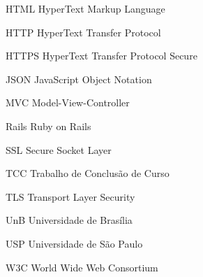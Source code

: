 \begin{siglas}
  \item[HTML] HyperText Markup Language
  \item[HTTP] HyperText Transfer Protocol
  \item[HTTPS] HyperText Transfer Protocol Secure
  \item[JSON] JavaScript Object Notation
  \item[MVC] Model-View-Controller
  \item[Rails] Ruby on Rails
  \item[SSL] Secure Socket Layer
  \item[TCC] Trabalho de Conclusão de Curso
  \item[TLS] Transport Layer Security
  \item[UnB] Universidade de Brasília
  \item[USP] Universidade de São Paulo
  \item[W3C] World Wide Web Consortium
\end{siglas}
